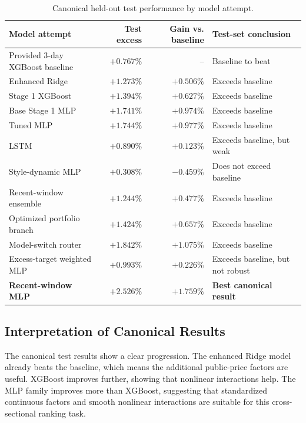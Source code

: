 \documentclass[11pt]{article}
\begin{document}
\begin{table}[h]
\centering
\caption{Canonical held-out test performance by model attempt.}
\label{tab:canonical-results}
\begin{tabular}{p{}rrp{}}
\toprule
Model attempt & Test excess & Gain vs. baseline & Test-set conclusion \\
\midrule
Provided 3-day XGBoost baseline & \(+0.767\%\) & -- & Baseline to beat \\
Enhanced Ridge & \(+1.273\%\) & \(+0.506\%\) & Exceeds baseline \\
Stage 1 XGBoost & \(+1.394\%\) & \(+0.627\%\) & Exceeds baseline \\
Base Stage 1 MLP & \(+1.741\%\) & \(+0.974\%\) & Exceeds baseline \\
Tuned MLP & \(+1.744\%\) & \(+0.977\%\) & Exceeds baseline \\
LSTM & \(+0.890\%\) & \(+0.123\%\) & Exceeds baseline, but weak \\
Style-dynamic MLP & \(+0.308\%\) & \(-0.459\%\) & Does not exceed baseline \\
Recent-window ensemble & \(+1.244\%\) & \(+0.477\%\) & Exceeds baseline \\
Optimized portfolio branch & \(+1.424\%\) & \(+0.657\%\) & Exceeds baseline \\
Model-switch router & \(+1.842\%\) & \(+1.075\%\) & Exceeds baseline \\
Excess-target weighted MLP & \(+0.993\%\) & \(+0.226\%\) & Exceeds baseline, but not robust \\
\textbf{Recent-window MLP} & \(\mathbf{+2.526\%}\) & \(\mathbf{+1.759\%}\) & \textbf{Best canonical result} \\
\bottomrule
\end{tabular}
\end{table}

\subsection{Interpretation of Canonical Results}

The canonical test results show a clear progression. The enhanced Ridge model
already beats the baseline, which means the additional public-price factors are
useful. XGBoost improves further, showing that nonlinear interactions help.
The MLP family improves more than XGBoost, suggesting that standardized
continuous factors and smooth nonlinear interactions are suitable for this
cross-sectional ranking task.
\end{document}
